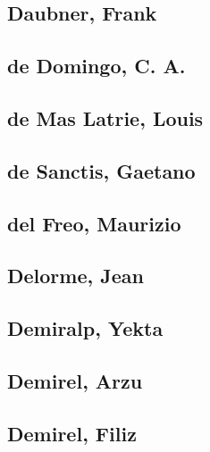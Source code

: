 \subsection[Daubner, Frank (1)]{Daubner, Frank}

\subsection[de Domingo, C. A. (1)]{de Domingo, C. A.}

\subsection[de Mas Latrie, Louis (1)]{de Mas Latrie, Louis}

\subsection[de Sanctis, Gaetano (2)]{de Sanctis, Gaetano}


\subsection[del Freo, Maurizio (1)]{del Freo, Maurizio}

\subsection[Delorme, Jean (1)]{Delorme, Jean}

\subsection[Demiralp, Yekta (2)]{Demiralp, Yekta}


\subsection[Demirel, Arzu (1)]{Demirel, Arzu}

\subsection[Demirel, Filiz (7)]{Demirel, Filiz}

